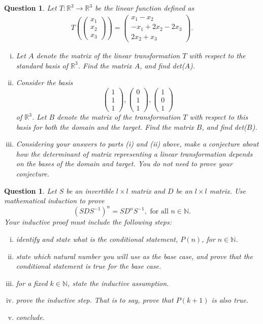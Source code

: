 \documentclass[12pt]{article}
\newtheorem{question}[thm]{Question}
\def\real{{\mathbb R}}
\def\Natural{\mathbb{N}}
\newcommand{\ColVecThree}[3]{\begin{pmatrix} #1\\ #2\\ #3\end{pmatrix}}
\begin{document}
\vspace{1cm}

\begin{question}
\normalfont
Let $T:\real^3\to\real^3$ be the linear function defined as
		\begin{align*}
			T(\ColVecThree{x_1}{x_2}{x_3}) = \ColVecThree{x_1-x_2}{-x_1+2x_2-2x_3}{2x_2 + x_3}.
\end{align*}

\begin{enumerate}[(i)]

\item Let $A$ denote the matrix of the linear transformation $T$ with respect to the standard basis of $\real^3$. Find the matrix $A$, and find det($A$). \\

\item Consider the basis 
\[
\ColVecThree{1}{1}{1}, \ColVecThree{0}{1}{1},
 \ColVecThree{1}{0}{1}
\]
of $\real^3$.  Let $B$ denote the matrix of the transformation $T$ with respect to this basis for both the domain and the target. Find the matrix $B$, and find det($B$). \\


\item Considering your answers to parts (i) and (ii) above, make a conjecture about how the determinant of matrix representing a linear transformation depends on the bases of the domain and target. You do not need to prove your conjecture. 
\end{enumerate}





\end{question}




\vspace{1cm}


	
	\vspace{.5cm}
	
\begin{question}
\normalfont
Let $S$ be an invertible $l \times l$ matrix and $D$ be an $l \times l$ matrix. Use mathematical induction to prove 
$$
\left(S D S^{-1} \right)^n = S D^n S^{-1}, \text{ for all } n \in \mathbb{N}.
$$ 
Your inductive proof must include the following steps:
	\begin{enumerate}[(i)]
		\item identify and state what is the conditional statement, $P(n)$, for $n\in \Natural$.
		\item state which natural number you will use as the base case, and prove that the conditional statement is true for the base case.
		\item for a fixed $k\in\Natural$, state the inductive assumption.
		\item prove the inductive step.  That is to say, prove that $P(k+1)$ is also true.
		\item conclude.
	\end{enumerate}
\end{question}











\end{document}
